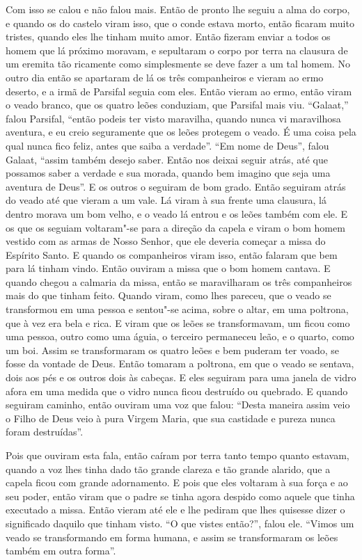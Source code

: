Com isso se calou e não falou mais. Então de pronto lhe seguiu a alma do corpo,
e quando os do castelo viram isso, que o conde estava morto, então ficaram
muito tristes, quando eles lhe tinham muito amor. Então fizeram enviar a todos
os homem que lá próximo moravam, e sepultaram o corpo por terra na clausura de
um eremita tão ricamente como simplesmente se deve fazer a um tal homem. No
outro dia então se apartaram de lá os três companheiros e vieram ao ermo
deserto, e a irmã de Parsifal seguia com eles. Então vieram ao ermo, então
viram o veado branco, que os quatro leões conduziam, que Parsifal mais viu.
“Galaat,” falou Parsifal, “então podeis ter visto maravilha, quando nunca vi
maravilhosa aventura, e eu creio seguramente que os leões protegem o veado. É
uma coisa pela qual nunca fico feliz, antes que saiba a verdade”. “Em nome de
Deus”, falou Galaat, “assim também desejo saber. Então nos deixai seguir atrás,
até que possamos saber a verdade e sua morada, quando bem imagino que seja uma
aventura de Deus”. E os outros o seguiram de bom grado. Então seguiram atrás do
veado até que vieram a um vale. Lá viram à sua frente uma clausura, lá dentro
morava um bom velho, e o veado lá entrou e os leões também com ele. E os que os
seguiam voltaram"-se para a direção da capela e viram o bom homem vestido com as
armas de Nosso Senhor, que ele deveria começar a missa do Espírito Santo. E
quando os companheiros viram isso, então falaram que bem para lá tinham vindo.
Então ouviram a missa que o bom homem cantava. E quando chegou a calmaria da
missa, então se maravilharam os três companheiros mais do que tinham feito.
Quando viram, como lhes pareceu, que o veado se transformou em uma pessoa e
sentou"-se acima, sobre o altar, em uma poltrona, que à vez era bela e rica. E
viram que os leões se transformavam, um ficou como uma pessoa, outro como uma
águia, o terceiro permaneceu leão, e o quarto, como um boi. Assim se
transformaram os quatro leões e bem puderam ter voado, se fosse da vontade de
Deus. Então tomaram a poltrona, em que o veado se sentava, dois aos pés e os
outros dois às cabeças. E eles seguiram para uma janela de vidro afora em uma
medida que o vidro nunca ficou destruído ou quebrado. E quando seguiram
caminho, então ouviram uma voz que falou: “Desta maneira assim veio o Filho de
Deus veio à pura Virgem Maria, que sua castidade e pureza nunca foram
destruídas”.

Pois que ouviram esta fala, então caíram por terra tanto tempo quanto estavam,
quando a voz lhes tinha dado tão grande clareza e tão grande alarido, que a
capela ficou com grande adornamento. E pois que eles voltaram à sua força e ao
seu poder, então viram que o padre se tinha agora despido como aquele que tinha
executado a missa. Então vieram até ele e lhe pediram que lhes quisesse dizer o
significado daquilo que tinham visto. “O que vistes então?”, falou ele. “Vimos
um veado se transformando em forma humana, e assim se transformaram os leões
também em outra forma”. 

